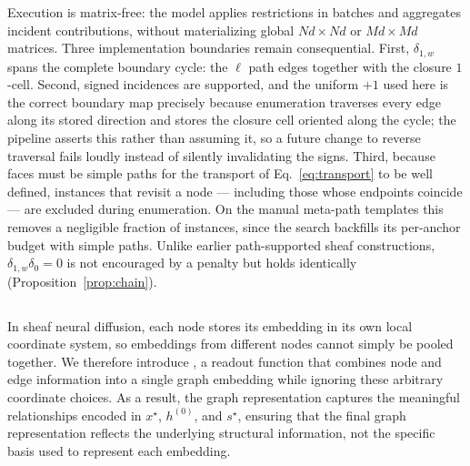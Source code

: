 Execution is matrix-free: the model applies restrictions in batches and aggregates incident
contributions, without materializing global \(Nd\times Nd\) or \(Md\times Md\) matrices.  Three
implementation boundaries remain consequential.  First, \(\delta_{1,w}\) spans the complete boundary
cycle: the \(\ell\) path edges together with the closure \(1\)-cell.  Second, signed incidences are
supported, and the uniform \(+1\) used here is the correct boundary map precisely because
enumeration traverses every edge along its stored direction and stores the closure cell oriented
along the cycle; the pipeline asserts this rather than assuming it, so a future change to reverse
traversal fails loudly instead of silently invalidating the signs.  Third, because faces must be
simple paths for the transport of Eq.~\eqref{eq:transport} to be well defined, instances that revisit
a node — including those whose endpoints coincide — are excluded during enumeration.  On the
manual meta-path templates this removes a negligible fraction of instances, since the search
backfills its per-anchor budget with simple paths.  Unlike earlier path-supported sheaf
constructions, \(\delta_{1,w}\delta_0=0\) is not encouraged by a penalty but holds identically
(Proposition~\ref{prop:chain}).



\subsection{\sheafcovpool{}}

In sheaf neural diffusion, each node stores its embedding in its own local coordinate system, so embeddings from different nodes cannot simply be pooled together. We therefore introduce \sheafcovpool{}, a readout function that combines node and edge information into a single graph embedding while ignoring these arbitrary coordinate choices. As a result, the graph representation captures the meaningful relationships encoded in \(x^\star\), \(h^{(0)}\), and \(s^\star\), ensuring that the final graph representation reflects the underlying structural information, not the specific basis used to represent each embedding.

